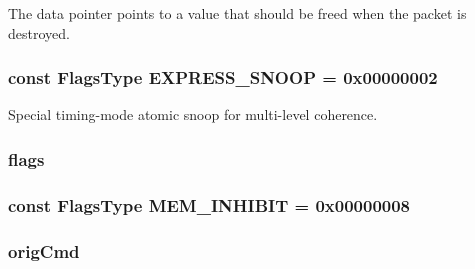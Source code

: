 \label{classPacket_a0100d751aaef8a927f7ba551550d142b}
The data pointer points to a value that should be freed when the packet is destroyed. \hypertarget{classPacket_a0b5a042e640242aeaeeebef73a69df26}{
\subsubsection[{EXPRESS\_\-SNOOP}]{\setlength{\rightskip}{0pt plus 5cm}const {\bf FlagsType} {\bf EXPRESS\_\-SNOOP} = 0x00000002}}
\label{classPacket_a0b5a042e640242aeaeeebef73a69df26}


Special timing-\/mode atomic snoop for multi-\/level coherence. \hypertarget{classPacket_aa991e2b209ef26272bf4fd920777bcda}{
\subsubsection[{flags}]{ {\bf flags}}}
\label{classPacket_aa991e2b209ef26272bf4fd920777bcda}
\hypertarget{classPacket_aae6e80e571cf0888e7583aa556c3f171}{
\subsubsection[{MEM\_\-INHIBIT}]{\setlength{\rightskip}{0pt plus 5cm}const {\bf FlagsType} {\bf MEM\_\-INHIBIT} = 0x00000008}}
\label{classPacket_aae6e80e571cf0888e7583aa556c3f171}
\hypertarget{classPacket_a98424e5b505c05a999a7e03dd4caa0fa}{
\subsubsection[{origCmd}]{ {\bf origCmd}}}
\label{classPacket_a98424e5b505c05a999a7e03dd4caa0fa}
